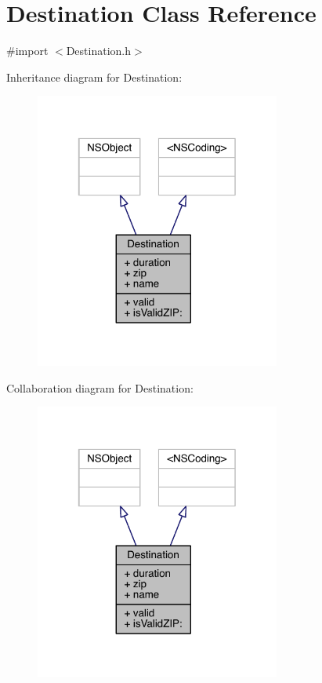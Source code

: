 \hypertarget{interface_destination}{\section{Destination Class Reference}
\label{interface_destination}
}


{\ttfamily \#import $<$Destination.\-h$>$}



Inheritance diagram for Destination\-:\nopagebreak
\begin{figure}[H]
\begin{center}
\leavevmode
\includegraphics[width=229pt]{interface_destination__inherit__graph}
\end{center}
\end{figure}


Collaboration diagram for Destination\-:\nopagebreak
\begin{figure}[H]
\begin{center}
\leavevmode
\includegraphics[width=229pt]{interface_destination__coll__graph}
\end{center}
\end{figure}
